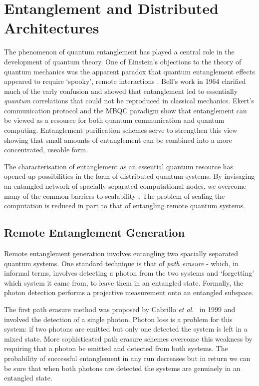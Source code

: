 \section{Entanglement and Distributed Architectures}

The phenomenon of quantum entanglement has played a central role in the development of quantum theory. One of Einstein's objections to the theory of quantum mechanics was the apparent paradox that quantum entanglement effects appeared to require `spooky', remote interactions \cite{epr}. Bell's work in 1964 \cite{bells_theorem} clarified much of the early confusion and showed that entanglement led to essentially \emph{quantum} correlations that could not be reproduced in classical mechanics. Ekert's communication protocol \cite{ekert_91} and the MBQC paradigm \cite{one_way_qc} show that entanglement can be viewed as a resource for both quantum communication and quantum computing. Entanglement purification schemes \cite{purification} serve to strengthen this view showing that small amounts of entanglement can be combined into a more concentrated, useable form.

The characterisation of entanglement as an essential quantum resource has opened up possibilities in the form of distributed quantum systems. By invisaging an entangled network of spacially separated computational nodes, we overcome many of the common barriers to scalability \cite{distributed_qip_review_08}. The problem of scaling the computation is reduced in part to that of entangling remote quantum systems.

\subsection{Remote Entanglement Generation}\label{remote_entanglement_generation}

Remote entanglement generation involves entangling two spacially separated quantum systems. One standard technique is that of \textit{path erasure} - which, in informal terms, involves detecting a photon from the two systems and `forgetting' which system it came from, to leave them in an entangled state. Formally, the photon detection performs a projective measurement onto an entangled subspace.

The first path erasure method was proposed by Cabrillo \textit{et al}.\ \cite{basic_path_erasure} in 1999 and involved the detection of a single photon. Photon loss is a problem for this system: if two photons are emitted but only one detected the system is left in a mixed state. More sophisticated path erasure schemes \cite{double_hearald_1, double_hearald_2, barrett+kok, double_hearald_3} overcome this weakness by requiring that a photon be emitted and detected from both systems. The probability of successful entanglement in any run decreases but in return we can be sure that when both photons are detected the systems are genuinely in an entangled state. 

